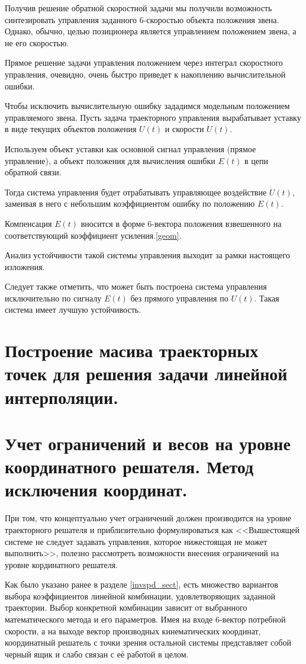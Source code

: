 \documentclass[12pt,a4paper,titlepage]{article}
\begin{document}
Получив решение обратной скоростной задачи мы получили возможность синтезировать управления заданного 6-скоростью объекта положения звена. Однако, обычно, целью позиционера является управлением положением звена, а не его скоростью.

Прямое решение задачи управления положением через интеграл скоростного управления, очевидно, очень быстро приведет к накоплению вычислительной ошибки.

Чтобы исключить вычислительную ошибку зададимся модельным положением управляемого звена. Пусть задача траекторного управления вырабатывает уставку в виде текущих объектов положения $U(t)$ и скорости $\dot{U}(t)$.

Используем объект уставки как основной сигнал управления (прямое управление), а объект положения для вычисления ошибки $E(t)$ в цепи обратной связи.

Тогда система управления будет отрабатывать управляющее воздействие $\dot{U}(t)$, замеивая в него с небольшим коэффициентом ошибку по положению $E(t)$.

Компенсация $E(t)$ вносится в форме 6-вектора положения взвешенного на соответствующий коэффициент усиления.\ref{geom}. 

Анализ устойчивости такой системы управления выходит за рамки настоящего изложения.

Следует также отметить, что может быть построена система управления исключительно по сигналу $E(t)$ без прямого управления по $U(t)$. Такая система имеет лучшую устойчивость.

\newpage
\section{Построение масива траекторных точек для решения задачи линейной интерполяции.}

\newpage
\section{Учет ограничений и весов на уровне координатного решателя. Метод исключения координат.}

При том, что концептуально учет ограничений должен производится на уровне траекторного решателя и приблизительно формулироваться как <<Вышестоящей системе не следует задавать управления, которое нижестоящая не может выполнить>>, полезно рассмотреть возможности внесения ограничений на уровне кординатного решателя.

Как было указано ранее в разделе \ref{invspd_sect}, есть множество вариантов выбора коэффициентов линейной комбинации, удовлетворяющих заданной траектории. Выбор конкретной комбинации зависит от выбранного математического метода и его параметров. Имея на входе 6-вектор потребной скорости, а на выходе вектор производных кинематических координат, координатный решатель с точки зрения остальной системы представляет собой черный ящик и слабо связан с её работой в целом.
\end{document}
